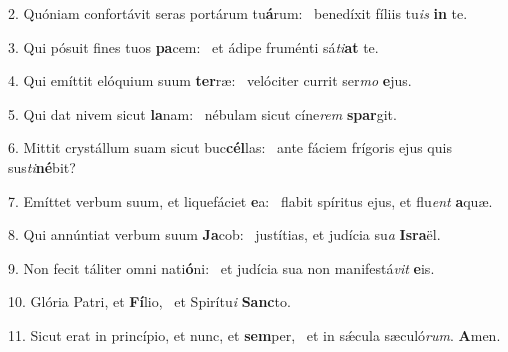 2. Quóniam confortávit seras portárum tu\textbf{á}rum: \ast\  benedíxit fíliis tu\textit{is} \textbf{in} te.\

3. Qui pósuit fines tuos \textbf{pa}cem: \ast\  et ádipe fruménti sá\textit{ti}\textbf{at} te.\

4. Qui emíttit elóquium suum \textbf{ter}ræ: \ast\  velóciter currit ser\textit{mo} \textbf{e}jus.\

5. Qui dat nivem sicut \textbf{la}nam: \ast\  nébulam sicut cíne\textit{rem} \textbf{spar}git.\

6. Mittit crystállum suam sicut buc\textbf{cél}las: \ast\  ante fáciem frígoris ejus quis sus\textit{ti}\textbf{né}bit?\

7. Emíttet verbum suum, et liquefáciet \textbf{e}a: \ast\  flabit spíritus ejus, et flu\textit{ent} \textbf{a}quæ.\

8. Qui annúntiat verbum suum \textbf{Ja}cob: \ast\  justítias, et judícia su\textit{a} \textbf{Is}\textbf{ra}ël.\

9. Non fecit táliter omni nati\textbf{ó}ni: \ast\  et judícia sua non manifestá\textit{vit} \textbf{e}is.\

10. Glória Patri, et \textbf{Fí}lio, \ast\  et Spirítu\textit{i} \textbf{Sanc}to.\

11. Sicut erat in princípio, et nunc, et \textbf{sem}per, \ast\  et in sǽcula sæculó\textit{rum}. \textbf{A}men.\

